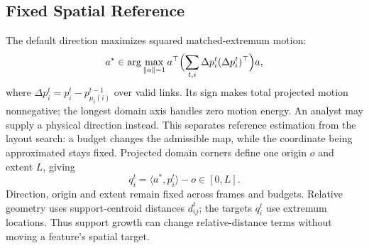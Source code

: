 \subsection{Fixed Spatial Reference}\label{sec:reference-model}
The default direction maximizes squared matched-extremum motion:
\begin{equation}\label{eq:autodirection}
a^*\in\arg\max_{\|a\|=1}a^\top\Bigl(\sum_{t,i}\Delta p_i^t(\Delta p_i^t)^\top\Bigr)a,
\end{equation}
where $\Delta p_i^t=p_i^t-p_{\mu_t(i)}^{t-1}$ over valid links. Its sign makes total projected motion nonnegative; the longest domain axis handles zero motion energy. An analyst may supply a physical direction instead. This separates reference estimation from the layout search: a budget changes the admissible map, while the coordinate being approximated stays fixed. Projected domain corners define one origin $o$ and extent $L$, giving
\begin{equation}\label{eq:reference}
q_i^t=\langle a^*,p_i^t\rangle-o\in[0,L].
\end{equation}
Direction, origin and extent remain fixed across frames and budgets. Relative geometry uses support-centroid distances $d_{ij}^t$; the targets $q_i^t$ use extremum locations. Thus support growth can change relative-distance terms without moving a feature's spatial target.

